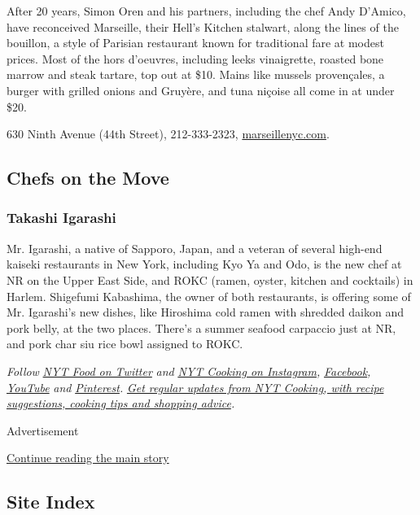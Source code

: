 After 20 years, Simon Oren and his partners, including the chef Andy
D'Amico, have reconceived Marseille, their Hell's Kitchen stalwart,
along the lines of the bouillon, a style of Parisian restaurant known
for traditional fare at modest prices. Most of the hors d'oeuvres,
including leeks vinaigrette, roasted bone marrow and steak tartare, top
out at \$10. Mains like mussels provençales, a burger with grilled
onions and Gruyère, and tuna niçoise all come in at under \$20.

630 Ninth Avenue (44th Street), 212-333-2323,
\href{https://marseillenyc.com/}{marseillenyc.com}.

\hypertarget{chefs-on-the-move}{%
\subsection{Chefs on the Move}\label{chefs-on-the-move}}

\hypertarget{takashi-igarashi-}{%
\subsubsection{Takashi Igarashi }\label{takashi-igarashi-}}

Mr. Igarashi, a native of Sapporo, Japan, and a veteran of several
high-end kaiseki restaurants in New York, including Kyo Ya and Odo, is
the new chef at NR on the Upper East Side, and ROKC (ramen, oyster,
kitchen and cocktails) in Harlem. Shigefumi Kabashima, the owner of both
restaurants, is offering some of Mr. Igarashi's new dishes, like
Hiroshima cold ramen with shredded daikon and pork belly, at the two
places. There's a summer seafood carpaccio just at NR, and pork char siu
rice bowl assigned to ROKC.

\emph{Follow} \href{https://twitter.com/nytfood}{\emph{NYT Food on
Twitter}} \emph{and}
\href{https://www.instagram.com/nytcooking/}{\emph{NYT Cooking on
Instagram}}\emph{,}
\href{https://www.facebookcorewwwi.onion/nytcooking/}{\emph{Facebook}}\emph{,}
\href{https://www.youtube.com/nytcooking}{\emph{YouTube}} \emph{and}
\href{https://www.pinterest.com/nytcooking/}{\emph{Pinterest}}\emph{.}
\href{https://www.nytimes3xbfgragh.onion/newsletters/cooking}{\emph{Get
regular updates from NYT Cooking, with recipe suggestions, cooking tips
and shopping advice}}\emph{.}

Advertisement

\protect\hyperlink{after-bottom}{Continue reading the main story}

\hypertarget{site-index}{%
\subsection{Site Index}\label{site-index}}


